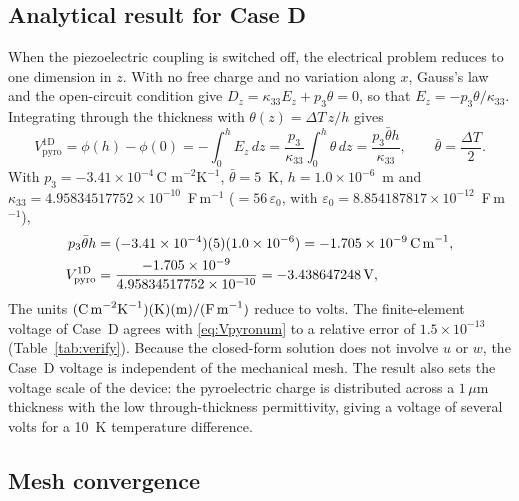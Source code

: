 \documentclass[a4paper,12pt]{elsarticle}
\begin{document}
\subsection{Analytical result for Case D}
\label{sec:caseD}

When the piezoelectric coupling is switched off, the electrical problem reduces to one
dimension in $z$. With no free charge and no variation along $x$, Gauss's law and the
open-circuit condition give
$D_z=\kappa_{33}E_z+p_3\theta=0$, so that
$E_z=-p_3\theta/\kappa_{33}$. Integrating through the thickness with
$\theta(z)=\Delta T\,z/h$ gives
\begin{equation}
V_{\mathrm{pyro}}^{\mathrm{1D}}=\phi(h)-\phi(0)
=-\int_0^h E_z\,dz
=\frac{p_3}{\kappa_{33}}\int_0^h\theta\,dz
=\frac{p_3\bar\theta h}{\kappa_{33}},
\qquad
\bar\theta=\frac{\Delta T}{2}.
\label{eq:Vpyro}
\end{equation}
With $p_3=-3.41\times10^{-4}\,\text{C m}^{-2}\text{K}^{-1}$,
$\bar\theta=5$~K, $h=1.0\times10^{-6}$~m and
$\kappa_{33}=4.95834517752\times10^{-10}$~F\,m$^{-1}$
($=56\,\varepsilon_0$, with $\varepsilon_0=8.854187817\times10^{-12}$~F\,m$^{-1}$),
\begin{align}
p_3\bar\theta h
&=(-3.41\times10^{-4})(5)(1.0\times10^{-6})
=-1.705\times10^{-9}\,\text{C\,m}^{-1},
\notag\\
V_{\mathrm{pyro}}^{\mathrm{1D}}
&=\frac{-1.705\times10^{-9}}{4.95834517752\times10^{-10}}
=-3.438647248\,\text{V},
\label{eq:Vpyronum}
\end{align}
The units
$(\text{C\,m}^{-2}\text{K}^{-1})(\text{K})(\text{m})/
(\text{F\,m}^{-1})$ reduce to volts. The finite-element voltage of Case~D agrees
with \eqref{eq:Vpyronum} to a relative error of $1.5\times10^{-13}$
(Table~\ref{tab:verify}). Because the closed-form solution does not involve $u$ or
$w$, the Case~D voltage is independent of the mechanical mesh. The result also sets the voltage scale of the
device: the pyroelectric charge is distributed across a $1\,\mu$m thickness with the
low through-thickness permittivity, giving a voltage of several volts for a 10~K
temperature difference.

\subsection{Mesh convergence}
\label{sec:mesh-convergence}
\end{document}
